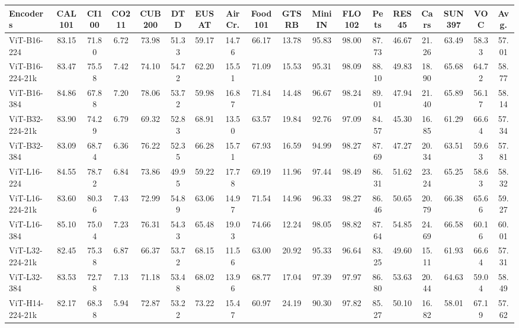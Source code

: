 \begin{tabular}{l ccccccccccccccccc}
\toprule
Encoders & CAL101 & CI100 & CO211 & CUB200 & DTD & EUSAT & AirCr. & Food101 & GTSRB & MiniIN & FLO102 & Pets & RES45 & Cars & SUN397 & VOC & Avg. \\ \hline
ViT-B16-224 & 83.15 & 71.80 & 6.72 & 73.98 & 51.33 & 59.17 & 14.76 & 66.17 & 13.78 & 95.83 & 98.00 & 87.73 & 46.67 & 21.26 & 63.49 & 58.33 & 57.01\\
ViT-B16-224-21k & 83.47 & 75.58 & 7.42 & 74.10 & 54.72 & 62.20 & 15.51 & 71.09 & 15.53 & 95.31 & 98.09 & 88.10 & 49.83 & 18.90 & 65.68 & 64.72 & 58.77\\
ViT-B16-384 & 84.86 & 67.88 & 7.20 & 78.06 & 53.72 & 59.98 & 16.87 & 71.84 & 14.48 & 96.67 & 98.24 & 89.01 & 47.94 & 21.40 & 65.89 & 56.17 & 58.14\\
ViT-B32-224-21k & 83.90 & 74.29 & 6.79 & 69.32 & 52.83 & 68.91 & 13.50 & 63.57 & 19.84 & 92.76 & 97.09 & 84.57 & 45.30 & 16.85 & 61.29 & 66.64 & 57.34\\
ViT-B32-384 & 83.09 & 68.74 & 6.36 & 76.22 & 52.35 & 66.28 & 15.71 & 67.93 & 16.59 & 94.99 & 98.27 & 87.69 & 47.27 & 20.34 & 63.51 & 59.63 & 57.81\\
ViT-L16-224 & 84.55 & 78.72 & 6.84 & 73.86 & 49.95 & 59.22 & 17.78 & 69.19 & 11.96 & 97.44 & 98.49 & 86.31 & 51.62 & 23.24 & 65.25 & 58.63 & 58.32\\
ViT-L16-224-21k & 83.60 & 80.36 & 7.43 & 72.99 & 54.89 & 63.06 & 14.97 & 71.54 & 14.96 & 96.33 & 98.27 & 86.46 & 50.65 & 20.79 & 66.38 & 65.66 & 59.27\\
ViT-L16-384 & 85.10 & 75.04 & 7.23 & 76.31 & 54.33 & 65.48 & 19.03 & 74.66 & 12.24 & 98.05 & 98.82 & 87.64 & 54.85 & 24.69 & 66.58 & 60.16 & 60.01\\
ViT-L32-224-21k & 82.45 & 75.38 & 6.87 & 66.37 & 53.72 & 68.15 & 11.56 & 63.00 & 20.92 & 95.33 & 96.64 & 83.25 & 49.60 & 15.11 & 61.93 & 66.64 & 57.31\\
ViT-L32-384 & 83.53 & 72.78 & 7.13 & 71.18 & 53.48 & 68.02 & 13.96 & 68.77 & 17.04 & 97.39 & 97.97 & 86.80 & 53.63 & 20.44 & 64.63 & 59.04 & 58.49\\
ViT-H14-224-21k & 82.17 & 68.38 & 5.94 & 72.87 & 53.22 & 73.22 & 15.47 & 60.97 & 24.19 & 90.30 & 97.82 & 85.27 & 50.10 & 16.82 & 58.01 & 67.19 & 57.62\\
\bottomrule
\end{tabular}
